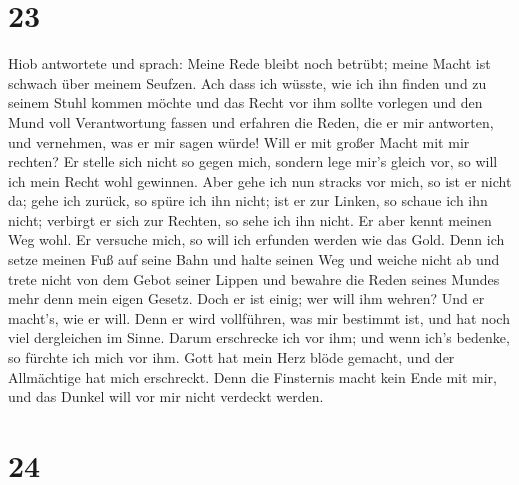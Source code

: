 \hypertarget{section-22}{%
\section{23}\label{section-22}}

 Hiob antwortete und sprach:  Meine Rede
bleibt noch betrübt; meine Macht ist schwach über meinem Seufzen.
 Ach dass ich wüsste, wie ich ihn finden und zu seinem
Stuhl kommen möchte  und das Recht vor ihm sollte vorlegen
und den Mund voll Verantwortung fassen  und erfahren die
Reden, die er mir antworten, und vernehmen, was er mir sagen würde!
 Will er mit großer Macht mit mir rechten? Er stelle sich
nicht so gegen mich,  sondern lege mir's gleich vor, so
will ich mein Recht wohl gewinnen.  Aber gehe ich nun
stracks vor mich, so ist er nicht da; gehe ich zurück, so spüre ich ihn
nicht;  ist er zur Linken, so schaue ich ihn nicht;
verbirgt er sich zur Rechten, so sehe ich ihn nicht.  Er
aber kennt meinen Weg wohl. Er versuche mich, so will ich erfunden
werden wie das Gold.  Denn ich setze meinen Fuß auf seine
Bahn und halte seinen Weg und weiche nicht ab  und trete
nicht von dem Gebot seiner Lippen und bewahre die Reden seines Mundes
mehr denn mein eigen Gesetz.  Doch er ist einig; wer will
ihm wehren? Und er macht's, wie er will.  Denn er wird
vollführen, was mir bestimmt ist, und hat noch viel dergleichen im
Sinne.  Darum erschrecke ich vor ihm; und wenn ich's
bedenke, so fürchte ich mich vor ihm.  Gott hat mein Herz
blöde gemacht, und der Allmächtige hat mich erschreckt. 
Denn die Finsternis macht kein Ende mit mir, und das Dunkel will vor mir
nicht verdeckt werden.

\hypertarget{section-23}{%
\section{24}\label{section-23}}

